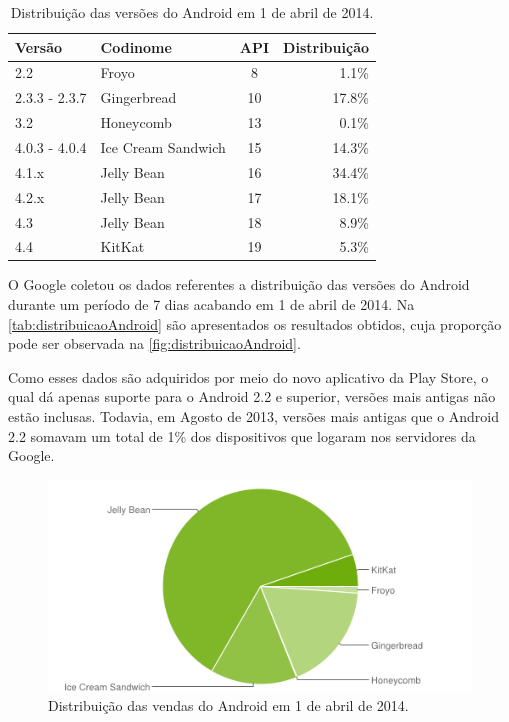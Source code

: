 \documentclass[a4paper,12pt,brazil,oneside]{book}
\begin{document}
\begin{singlespace}
\begin{table}[htb!]
  \centering
    \begin{tabular}{llcr}
     \rowcolor{Gray} \hline 
    Versão        & Codinome           & API & Distribuição \\ \hline \hline
    2.2           & Froyo              & 8   & 1.1\%        \\ 
    2.3.3 - 2.3.7 & Gingerbread        & 10  & 17.8\%       \\ 
    3.2           & Honeycomb          & 13  & 0.1\%        \\ 
    4.0.3 - 4.0.4 & Ice Cream Sandwich & 15  & 14.3\%       \\ 
    4.1.x         & Jelly Bean         & 16  & 34.4\%       \\ 
    4.2.x         & Jelly Bean         & 17  & 18.1\%        \\
    4.3         & Jelly Bean         & 18  & 8.9\%        \\ 
    4.4         & KitKat        & 19  & 5.3\%        \\ \hline
    \end{tabular}
    \caption{Distribuição das versões do Android em 1 de abril de 2014.}
     \label{tab:distribuicaoAndroid}
\end{table}

O Google coletou os dados referentes a distribuição das versões do Android durante um período de 7 dias acabando em 1 de abril de 2014. Na \autoref{tab:distribuicaoAndroid} são apresentados os resultados obtidos, cuja proporção pode ser observada na \autoref{fig:distribuicaoAndroid}. 

Como esses dados são adquiridos por meio do novo aplicativo da Play Store, o qual dá apenas suporte para o Android 2.2 e superior, versões mais antigas não estão inclusas. Todavia, em Agosto de 2013, versões mais antigas que o Android 2.2 somavam um total de 1\% dos dispositivos que logaram nos servidores da Google.

\begin{figure}[H]
  \centering
  \includegraphics[width=.75\textwidth]{figuras/introducao/chart.png}
  \caption{Distribuição das vendas do Android em 1 de abril de 2014.}
  \label{fig:distribuicaoAndroid}
\end{figure}


\end{singlespace}
\end{document}
